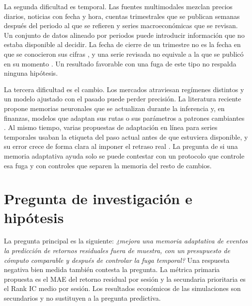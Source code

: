 \documentclass[11pt,a4paper]{report}
\begin{document}
La segunda dificultad es temporal. Las fuentes multimodales mezclan precios
diarios, noticias con fecha y hora, cuentas trimestrales que se publican
semanas después del periodo al que se refieren y series macroeconómicas que se
revisan. Un conjunto de datos alineado por periodos puede introducir
información que no estaba disponible al decidir. La fecha de cierre de un
trimestre no es la fecha en que se conocieron sus cifras
\parencite{sec_edgar_timestamps}, y una serie revisada no equivale a la que se
publicó en su momento \parencite{alfred_vintages}. Un resultado favorable con
una fuga de este tipo no respalda ninguna hipótesis.

La tercera dificultad es el cambio. Los mercados atraviesan regímenes distintos
y un modelo ajustado con el pasado puede perder precisión. La literatura
reciente propone memorias neuronales que se actualizan durante la inferencia
\parencite{behrouz2025titans,sun2025ttt} y, en finanzas, modelos que adaptan
sus rutas o sus parámetros a patrones cambiantes
\parencite{lin2021tra,zhao2023doubleadapt}. Al mismo tiempo, varias
propuestas de adaptación en línea para series temporales usaban la etiqueta
del paso actual antes de que estuviera disponible, y su error crece de forma
clara al imponer el retraso real \parencite{zhao2025proceed,lau2025dsof}.
La pregunta de si una memoria adaptativa ayuda solo se puede contestar con un
protocolo que controle esa fuga y con controles que separen la memoria del
resto de cambios.

\section{Pregunta de investigación e hipótesis}
La pregunta principal es la siguiente: \emph{¿mejora una memoria adaptativa de
eventos la predicción de retornos residuales fuera de muestra, con un
presupuesto de cómputo comparable y después de controlar la fuga temporal?}
Una respuesta negativa bien medida también contesta la pregunta. La métrica
primaria propuesta es el MAE del retorno residual por sesión y la secundaria
prioritaria es el Rank IC medio por sesión. Los resultados económicos de las
simulaciones son secundarios y no sustituyen a la pregunta predictiva.
\end{document}
